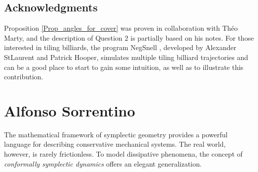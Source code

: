 \documentclass[11pt]{article}
\theoremstyle{definition}
\newtheorem{remark}[lemma]{Remark}
\begin{document}




\subsection*{Acknowledgments}
Proposition \ref{Prop_angles_for_cover} was proven in collaboration with Théo Marty, and the description of Question $2$ is partially based on his notes. For those interested in tiling billiards, the program NegSnell \cite{program}, developed by Alexander StLaurent and Patrick Hooper, simulates multiple tiling billiard trajectories and can be a good place to start to gain some intuition, as well as to illustrate this contribution.



\section*{Alfonso Sorrentino}

The mathematical framework of symplectic geometry provides a powerful language for describing conservative mechanical systems. The real world, however, is rarely frictionless. To model dissipative phenomena, the concept of \emph{conformally symplectic dynamics} offers an elegant generalization.
\end{document}
